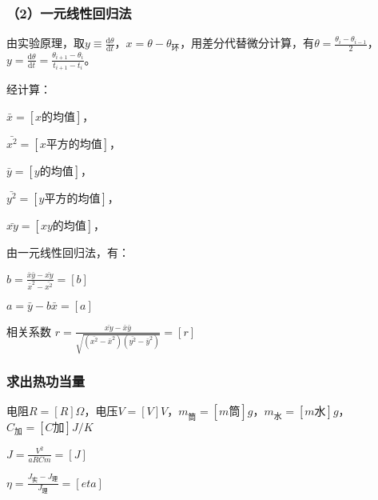 \documentclass[11pt,a4paper,oneside]{article}
\begin{document}
\subsubsection{（2）一元线性回归法}
由实验原理，取$y\equiv \displaystyle\frac{\mathrm{d} \theta}{\mathrm{d} t}$，$x = \theta - \theta _环$，用差分代替微分计算，有$\theta = \displaystyle\frac{\theta _i - \theta _{i-1}}{2}$，$y = \displaystyle\frac{\mathrm{d} \theta}{\mathrm{d} t} = \displaystyle\frac{\theta _{i+1}-\theta _i }{t_{i+1}-t_i}$。

经计算：

$\bar{x} = [x的均值]$，

$\bar{x^2} = [x平方的均值]$，

$\bar{y} = [y的均值]$，

$\bar{y^2} = [y平方的均值]$，

$\bar{xy} = [xy的均值]$，

由一元线性回归法，有：

$b= \displaystyle\frac{\bar{x}\bar{y}-\bar{xy}}{\bar{x}^2-\bar{x^2}} = [b]$

$a = \bar{y} - b\bar{x} = [a]$

相关系数 $r =\displaystyle\frac{\bar{xy}-\bar{x}\bar{y}}{\sqrt{(\bar{x^2}-\bar{x}^2)(\bar{y^2}-\bar{y}^2)}} =[r]$

\subsubsection{求出热功当量}
电阻$R= [R]\Omega$，电压$V = [V]V$，$m_筒 = [m筒]g$，$m_水 = [m水]g$，$C_加 = [C加]J/K$

$J= \displaystyle\frac{V^2}{aRCm} = [J]$

$\eta  = \displaystyle\frac{J_实 - J_理}{J_理} = [eta]$
\end{document}
